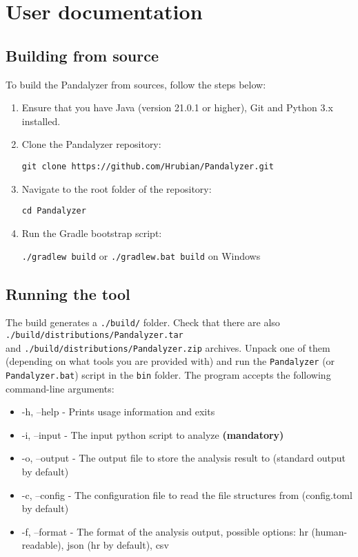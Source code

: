 \chapter{User documentation}\label{ch:user-documentation}


\section{Building from source}

To build the Pandalyzer from sources, follow the steps below:
\begin{enumerate}
    \item Ensure that you have Java (version 21.0.1 or higher), Git and Python 3.x installed.
    \item Clone the Pandalyzer repository:

    \verb|git clone https://github.com/Hrubian/Pandalyzer.git|
    \item Navigate to the root folder of the repository:

    \verb|cd Pandalyzer|
    \item Run the Gradle bootstrap script:

    \verb|./gradlew build| or \verb|./gradlew.bat build| on Windows
\end{enumerate}

\section{Running the tool}

The build generates a \verb|./build/| folder.
Check that there are also \\ \verb|./build/distributions/Pandalyzer.tar| \\ and
\verb|./build/distributions/Pandalyzer.zip| archives.
Unpack one of them (depending on what tools you are provided with) and run the \verb|Pandalyzer| (or
\verb|Pandalyzer.bat|) script in the \verb|bin| folder.
The program accepts the following command-line arguments:
\begin{itemize}
    \item -h, --help - Prints usage information and exits
    \item -i, --input - The input python script to analyze \textbf{(mandatory)}
    \item -o, --output - The output file to store the analysis result to (standard output by default)
    \item -c, --config - The configuration file to read the file structures from (config.toml by default)
    \item -f, --format - The format of the analysis output, possible options: hr (human-readable), json (hr by default), csv
\end{itemize}
